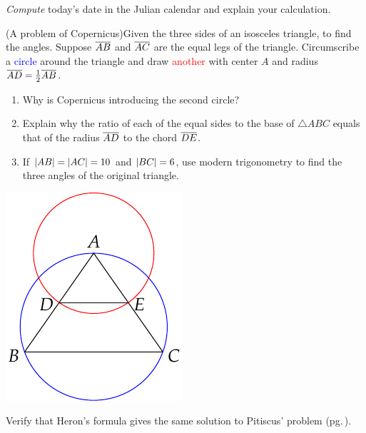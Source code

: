\begin{exercises}{}{}
\exstart \emph{Compute} today's date in the Julian calendar and explain your calculation.

\begin{enumerate}\setcounter{enumi}{1}
 \begin{minipage}[t]{0.7\linewidth}\vspace{3pt}
 \item%
 (A problem of Copernicus)\lstsp Given the three sides of an isosceles triangle, to find the angles.\smallbreak
  Suppose $\overline{AB}$ and $\overline{AC}$ are the equal legs of the triangle. Circumscribe a \textcolor{blue}{circle} around the triangle and draw \textcolor{red}{another} with center $A$ and radius $\overline{AD}=\frac 12\overline{AB}$.
	\begin{enumerate}
	  \item Why is Copernicus introducing the second circle?
	  \item Explain why the ratio of each of the equal sides to the base of $\triangle ABC$ equals that of the radius $\overline{AD}$ to the chord $\overline{DE}$.
	  \item If $\left| AB\right|=\left| AC\right|=10$ and $\left| BC\right|=6$, use modern trigonometry to find the three angles of the original triangle.
	\end{enumerate}
\end{minipage}\hfill\begin{minipage}[t]{0.28\linewidth}\vspace{3pt}
	\flushright\includegraphics{hw5-copisotri}
\end{minipage}

  \item Verify that Heron's formula gives the same solution to Pitiscus' problem (pg.\,\pageref{ex:pitiscus}).
  

\end{enumerate}
\end{exercises}
